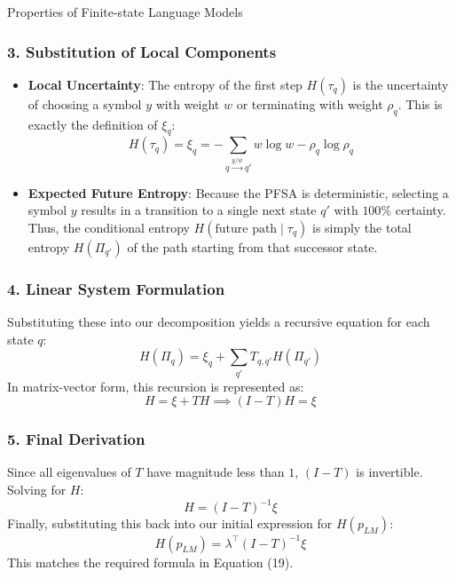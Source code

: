 \begin{question}{Properties of Finite-state Language Models}
\begin{subquestion}
\subsubsection*{3. Substitution of Local Components}
\begin{itemize}
    \item \textbf{Local Uncertainty}: The entropy of the first step $H(\tau_q)$ is the uncertainty of choosing a symbol $y$ with weight $w$ or terminating with weight $\rho_q$. This is exactly the definition of $\xi_q$:
    \begin{equation}
        H(\tau_q) = \xi_q = -\sum_{q \xrightarrow{y/w} q'} w \log w - \rho_q \log \rho_q
    \end{equation}
    \item \textbf{Expected Future Entropy}: Because the PFSA is deterministic, selecting a symbol $y$ results in a transition to a single next state $q'$ with $100\%$ certainty. Thus, the conditional entropy $H(\text{future path} \mid \tau_q)$ is simply the total entropy $H(\Pi_{q'})$ of the path starting from that successor state.
\end{itemize}

\subsubsection*{4. Linear System Formulation}
Substituting these into our decomposition yields a recursive equation for each state $q$:
\begin{equation}
    H(\Pi_q) = \xi_q + \sum_{q'} T_{q,q'} H(\Pi_{q'})
\end{equation}
In matrix-vector form, this recursion is represented as:
\begin{equation}
    H = \xi + TH \implies (I - T)H = \xi
\end{equation}

\subsubsection*{5. Final Derivation}
Since all eigenvalues of $T$ have magnitude less than $1$, $(I - T)$ is invertible. Solving for $H$:
\begin{equation}
    H = (I - T)^{-1} \xi
\end{equation}
Finally, substituting this back into our initial expression for $H(p_{LM})$:
\begin{equation}
    H(p_{LM}) = \lambda^{\top} (I - T)^{-1} \xi
\end{equation}
This matches the required formula in Equation (19).

\end{subquestion}

\end{question}